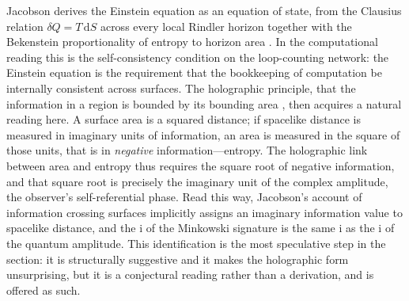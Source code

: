 Jacobson derives the Einstein equation as an equation of state, from the Clausius
relation $\delta Q=T\,\mathrm{d}S$ across every local Rindler horizon together
with the Bekenstein proportionality of entropy to horizon area
\autocite{Jacobson1995, Bekenstein1973}. In the computational reading this is the
self-consistency condition on the loop-counting network: the Einstein equation is
the requirement that the bookkeeping of computation be internally consistent
across surfaces. The holographic principle, that the information in a region is
bounded by its bounding area \autocite{tHooft1993, Susskind1995}, then acquires a
natural reading here. A surface area is a squared distance; if spacelike distance
is measured in imaginary units of information, an area is measured in the square of
those units, that is in \emph{negative} information---entropy. The holographic
link between area and entropy thus requires the square root of negative
information, and that square root is precisely the imaginary unit of the complex
amplitude, the observer's self-referential phase. Read this way, Jacobson's
account of information crossing surfaces implicitly assigns an imaginary
information value to spacelike distance, and the $\mathrm{i}$ of the Minkowski
signature is the same $\mathrm{i}$ as the $\mathrm{i}$ of the quantum amplitude.
This identification is the most speculative step in the section: it is
structurally suggestive and it makes the holographic form unsurprising, but it is
a conjectural reading rather than a derivation, and is offered as such.

